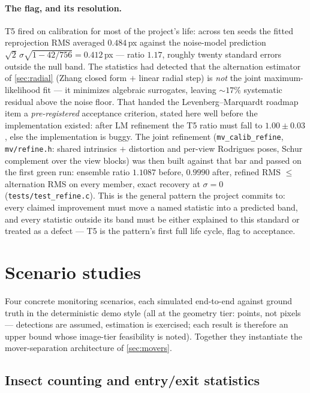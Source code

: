 \documentclass[11pt]{article}
\theoremstyle{definition}
\newcommand{\code}[1]{\texttt{#1}}
\begin{document}
\paragraph{The flag, and its resolution.} T5 fired on calibration
for most of the project's life: across ten seeds the fitted
reprojection RMS averaged $0.484$\,px against the noise-model
prediction $\sqrt2\,\sigma\sqrt{1-42/756}=0.412$\,px --- ratio
$1.17$, roughly twenty standard errors outside the null band. The
statistics had detected that the alternation estimator of
\autoref{sec:radial} (Zhang closed form $+$ linear radial step) is
\emph{not} the joint maximum-likelihood fit --- it minimizes
algebraic surrogates, leaving $\sim17\%$ systematic residual above
the noise floor. That handed the Levenberg--Marquardt roadmap item a
\emph{pre-registered} acceptance criterion, stated here well before
the implementation existed: after LM refinement the T5 ratio must
fall to $1.00\pm0.03$, else the implementation is buggy. The joint
refinement (\code{mv\_calib\_refine}, \code{mv/refine.h}: shared
intrinsics $+$ distortion and per-view Rodrigues poses, Schur
complement over the view blocks) was then built against that bar and
passed on the first green run: ensemble ratio $1.1087$ before,
$\mathbf{0.9990}$ after, refined RMS $\leq$ alternation RMS on every
member, exact recovery at $\sigma=0$
(\code{tests/test\_refine.c}). This is the general pattern the
project commits to: every claimed improvement must move a named
statistic into a predicted band, and every statistic outside its band
must be either explained to this standard or treated as a defect ---
T5 is the pattern's first full life cycle, flag to acceptance.

\section{Scenario studies}
\label{sec:scenarios}

Four concrete monitoring scenarios, each simulated end-to-end against
ground truth in the deterministic demo style (all at the geometry tier:
points, not pixels --- detections are assumed, estimation is exercised;
each result is therefore an upper bound whose image-tier feasibility is
noted). Together they instantiate the mover-separation architecture of
\autoref{sec:movers}.

\subsection{Insect counting and entry/exit statistics}
\label{sec:insects}
\end{document}
